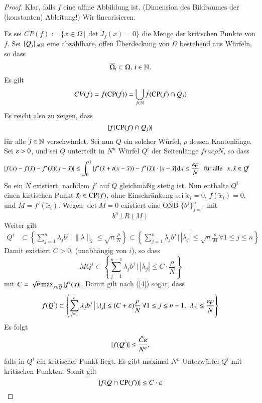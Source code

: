 \begin{proof}
    Klar, falls $f$ eine affine Abbildung ist. (Dimension des Bildraumes der (konstanten) Ableitung!)
    Wir linearisieren. 

    \noindent Es sei $CP(f):=\{x\in \Omega\,|\, \det J_f(x)=0\}$ die Menge der kritischen Punkte von $f$.
    Sei $\{ Q_j \}_{j\in \mathbb{N}}$ eine abzählbare, offen Überdeckung von $\Omega$ bestehend aus Würfeln,
    so dass
    \[
        \overline \Omega_i\subset \Omega, \, i\in \mathbb{N}.
    \]
    Es gilt 
    \[
        CV(f)=f(\mathrm{CP}(f))=\bigcup_{j\in \mathbb{N}} f(\mathrm{CP}(f)\cap Q_j)
    \]
    Es reicht also zu zeigen, dass
    \[
    |f(\mathrm{CP}(f)\cap Q_j)|
    \]
    für alle $j\in \mathbb{N}$ verschwindet. Sei nun $Q$ ein solcher Würfel, $\rho$ dessen Kantenlänge.
    Sei $\varepsilon >0$, und sei $Q$ unterteilt in $N^n$ Würfel $Q^i$ der Seitenlänge $frac{\rho}{N}$, so
    dass
    \begin{align}\label{4}
        |f(x)-f(\tilde x)-f'(\tilde x)(x-\tilde x)|&\leq \int_0^1|f'(\tilde x+t(x-\tilde x))-
        f'(\tilde x)|\cdot|x-\tilde x|\, \mathrm{d} x\leq \frac{\varepsilon\rho}{N} \hspace{.25cm} \text{für alle} 
            \hspace{.25cm} x,\tilde x \in Q^i
    \end{align}
    So ein $N$ existiert, nachdem $f'$ auf $Q$ gleichmäßig stetig ist. Nun enthalte $Q^i$ einen
    kirtischen Punkt $\tilde x_i \in \mathrm{CP}(f)$, ohne Einschränkung sei $\tilde x_i=0$, $f(\tilde x_i)=0$,
    und $M=f'(\tilde x _i)$. Wegen $\det M =0$ existiert eine ONB $\{b^j\}_{j=1}^n$ mit
    \[
    b^n \bot R(M)
    \]
    Weiter gilt 
    \begin{align*}
        Q^i&\subset \left\{ \sum_{j=1}^n \lambda _j b^j \, \big| \, \| \lambda \|_2\leq \sqrt{n} 
            \frac{\rho}{N} \right\}\subset\left\{\sum_{j=1}^n\lambda _jb^j \, \big|
            \, |\lambda_j|\leq \sqrt{n}\frac{\rho}{M} \, \forall 1\leq j\leq n\right\}
    \end{align*}
    Damit existiert $C>0$, (unabhängig von $i$), so dass
    \[
        MQ^i\subset \left\{\sum_{j=1}^{n-1}\lambda_jb^j\, \big| \, |\lambda_j|
            \leq C\cdot \frac{\rho}{N} \right\}
    \]
    mit $C=\sqrt{n} \max_{x\in \overline Q}|f'(x)| $. Damit gilt nach (\ref{4}) sogar, dass
    \[
        f(Q^i)\subset\left\{ \sum_{j=1}^n \lambda_jb^j\, \big| \, |\lambda_j|\leq 
        (C+\varepsilon)\frac{\rho}{N} \, \forall 1\leq j\leq n-1, \, |\lambda_n|\leq \frac{\varepsilon\rho}{N}\right\}
    \]
    Es folgt
    \[
        |f(Q^i)|\leq \frac{\tilde C\varepsilon}{N^n},
    \]
    falls in $Q^i$ ein kritischer Punkt liegt. Es gibt maximal $N^n$ Unterwürfel $Q^i$ mit kritischen
    Punkten. Somit gilt
    \[
        |f(Q\cap \mathrm{CP}(f))|\leq C\cdot \varepsilon
    \]

\end{proof}

